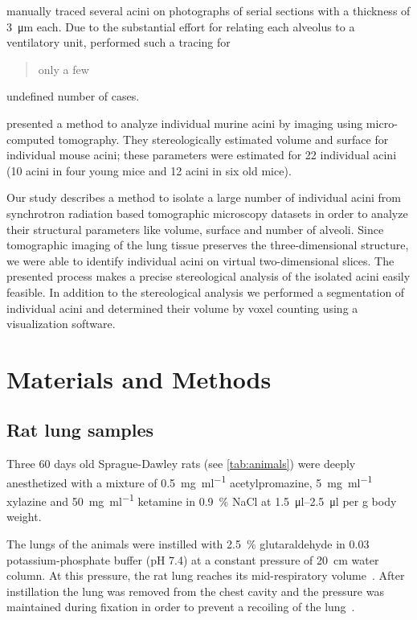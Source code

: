 \documentclass[paper=a4,DIV=calc,abstract,english]{scrartcl}
\begin{document}
\citet{Mercer1987a} manually traced several acini on photographs of serial sections with a thickness of \SI{3}{\micro\meter} each.
Due to the substantial effort for relating each alveolus to a ventilatory unit, \citeauthor{Mercer1987a} performed such a tracing for \blockquote{only a few} undefined number of cases.

\citet{Vasilescu2012} presented a method to analyze individual murine acini by imaging using micro-computed tomography.
They stereologically estimated volume and surface for individual mouse acini; these parameters were estimated for 22 individual acini (10 acini in four young mice and 12 acini in six old mice).

Our study describes a method to isolate a large number of individual acini from synchrotron radiation based tomographic microscopy datasets in order to analyze their structural parameters like volume, surface and number of alveoli.
Since tomographic imaging of the lung tissue preserves the three-dimensional structure, we were able to identify individual acini on virtual two-dimensional slices.
The presented process makes a precise stereological analysis of the isolated acini easily feasible.
In addition to the stereological analysis we performed a segmentation of individual acini and determined their volume by voxel counting using a visualization software.

\section{Materials and Methods}
\label{sec:materials and methods}
\subsection{Rat lung samples}
Three 60 days old Sprague-Dawley rats (see \autoref{tab:animals}) were deeply anesthetized with a mixture of %
\SI[per-mode=fraction]{0.5}{\milli\gram\per\milli\litre} acetylpromazine, %
\SI[per-mode=fraction]{5}{\milli\gram\per\milli\litre} xylazine and %
\SI[per-mode=fraction]{50}{\milli\gram\per\milli\litre} ketamine in %
\SI{0.9}{\percent} NaCl at \SIrange{1.5}{2.5}{\micro\litre} per \si{\gram} body weight.

The lungs of the animals were instilled with \SI{2.5}{\percent} glutaraldehyde in \SI{0.03}{\milli\Molar} potassium-phosphate buffer (pH 7.4) at a constant pressure of \SI{20}{\centi\meter} water column.
At this pressure, the rat lung reaches its mid-respiratory volume~.
After instillation the lung was removed from the chest cavity and the pressure was maintained during fixation in order to prevent a recoiling of the lung~\citep{Weibel1970,Weibel1984}.
\end{document}
